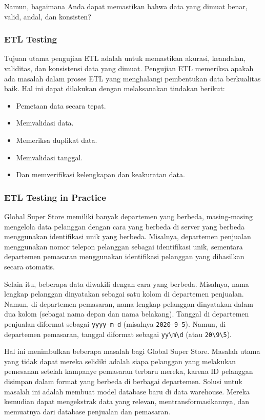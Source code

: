 \documentclass{article}
\begin{document}
Namun, bagaimana Anda dapat memastikan bahwa data yang dimuat benar, valid, andal, dan konsisten?

\subsubsection{ETL Testing}
Tujuan utama pengujian ETL adalah untuk memastikan akurasi, keandalan, validitas, dan konsistensi data yang dimuat. Pengujian ETL memeriksa apakah ada masalah dalam proses ETL yang menghalangi pembentukan data berkualitas baik. Hal ini dapat dilakukan dengan melaksanakan tindakan berikut:
\begin{itemize}
    \item Pemetaan data secara tepat.
    \item Memvalidasi data.
    \item Memeriksa duplikat data.
    \item Memvalidasi tanggal.
    \item Dan memverifikasi kelengkapan dan keakuratan data.
\end{itemize}

\subsubsection{ETL Testing in Practice}
Global Super Store memiliki banyak departemen yang berbeda, masing-masing mengelola data pelanggan dengan cara yang berbeda di server yang berbeda menggunakan identifikasi unik yang berbeda. Misalnya, departemen penjualan menggunakan nomor telepon pelanggan sebagai identifikasi unik, sementara departemen pemasaran menggunakan identifikasi pelanggan yang dihasilkan secara otomatis.

Selain itu, beberapa data diwakili dengan cara yang berbeda. Misalnya, nama lengkap pelanggan dinyatakan sebagai satu kolom di departemen penjualan. Namun, di departemen pemasaran, nama lengkap pelanggan dinyatakan dalam dua kolom (sebagai nama depan dan nama belakang). Tanggal di departemen penjualan diformat sebagai \verb|yyyy-m-d| (misalnya \verb|2020-9-5|). Namun, di departemen pemasaran, tanggal diformat sebagai \verb|yy\m\d| (atau \verb|20\9\5|).

Hal ini menimbulkan beberapa masalah bagi Global Super Store. Masalah utama yang tidak dapat mereka selidiki adalah siapa pelanggan yang melakukan pemesanan setelah kampanye pemasaran terbaru mereka, karena ID pelanggan disimpan dalam format yang berbeda di berbagai departemen. Solusi untuk masalah ini adalah membuat model database baru di data warehouse. Mereka kemudian dapat mengekstrak data yang relevan, mentransformasikannya, dan memuatnya dari database penjualan dan pemasaran.
\end{document}
